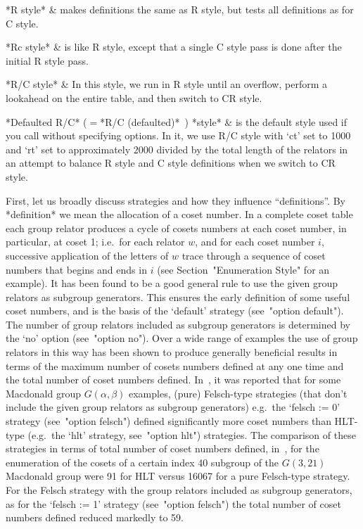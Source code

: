 *R\* style* &
makes definitions the same as R style, but tests  all  definitions  as
for C style.

*Rc style* &
is like R style, except that a single C style pass is done  after  the
initial R style pass.

*R/C style* &
In this style, we  run  in  R  style  until  an  overflow,  perform  a
lookahead on the entire table, and then switch to CR style.

*Defaulted R/C* ($={}$*R/C (defaulted)* $\,$) *style* &
is the default style  used  if  you  call  {\ACE}  without  specifying
options. In it, we use R/C style with `ct' set to 1000 and `rt' set to
approximately $2000$ divided by the total length of the relators in an
attempt to balance R style and C style definitions when we  switch  to
CR style.

\enditems


First, let us  broadly  discuss  strategies  and  how  they  influence
``definitions''. By *definition* we mean the  allocation  of  a  coset
number. In a complete coset table each group relator produces a  cycle
of cosets numbers at each coset number, in  particular,  at  coset  1;
i.e.~for each relator $w$, and for each coset number  $i$,  successive
application of the letters of $w$ trace through a  sequence  of  coset
numbers that begins and ends in $i$ (see  Section~"Enumeration  Style"
for an example). It has been found to be a good general  rule  to  use
the given group relators as  subgroup  generators.  This  ensures  the
early definition of some useful coset numbers, and is the basis of the
`default'  strategy  (see~"option  default").  The  number  of   group
relators included as subgroup generators is  determined  by  the  `no'
option (see~"option no"). Over a wide range of  examples  the  use  of
group relators in  this  way  has  been  shown  to  produce  generally
beneficial results in terms of the maximum number  of  cosets  numbers
defined at any one time and the total number of coset numbers defined.
In~\cite{CDHW73}, it  was  reported  that  for  some  Macdonald  group
$G(\alpha,\beta)$ examples, (pure) Felsch-type strategies (that  don't
include the given group  relators  as  subgroup  generators)  e.g.~the
`felsch := 0' strategy  (see~"option  felsch")  defined  significantly
more coset numbers than HLT-type (e.g.~the `hlt' strategy, see~"option
hlt") strategies. The comparison of these strategies in terms of total
number of coset numbers defined, in~\cite{Hav91}, for the  enumeration
of the cosets  of  a  certain  index  40  subgroup  of  the  $G(3,21)$
Macdonald group were 91 for HLT versus 16067 for  a  pure  Felsch-type
strategy. For the Felsch strategy with the group relators included  as
subgroup generators, as for the `felsch :=  1'  strategy  (see~"option
felsch") the total number of coset numbers defined reduced markedly to
59.

